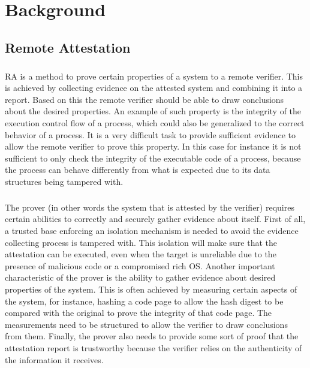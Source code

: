 \chapter{Background}

\section{Remote Attestation}

\paragraph*{}
RA is a method to prove certain properties of a system to a remote verifier. This is achieved by collecting evidence on the attested system and combining it into a report. Based on this the remote verifier should be able to draw conclusions about the desired properties. An example of such property is the integrity of the execution control flow of a process, which could also be generalized to the correct behavior of a process. It is a very difficult task to provide sufficient evidence to allow the remote verifier to prove this property. In this case for instance it is not sufficient to only check the integrity of the executable code of a process, because the process can behave differently from what is expected due to its data structures being tampered with.

\paragraph*{}
The prover (in other words the system that is attested by the verifier) requires certain abilities to correctly and securely gather evidence about itself. First of all, a trusted base enforcing an isolation mechanism is needed to avoid the evidence collecting process is tampered with. This isolation will make sure that the attestation can be executed, even when the target is unreliable due to the presence of malicious code or a compromised rich OS. Another important characteristic of the prover is the ability to gather evidence about desired properties of the system. This is often achieved by measuring certain aspects of the system, for instance, hashing a code page to allow the hash digest to be compared with the original to prove the integrity of that code page. The measurements need to be structured to allow the verifier to draw conclusions from them. Finally, the prover also needs to provide some sort of proof that the attestation report is trustworthy because the verifier relies on the authenticity of the information it receives.

